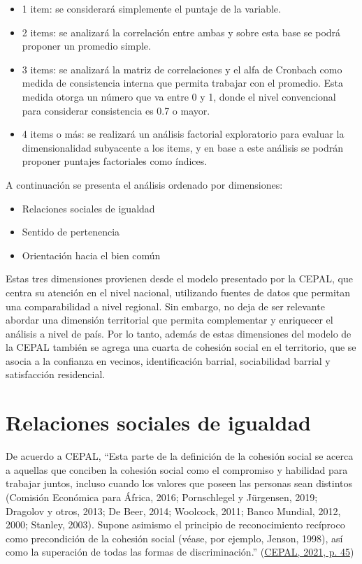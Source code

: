 \documentclass[
  12pt,
]{book}
\providecommand{\tightlist}{%
  \setlength{\itemsep}{0pt}\setlength{\parskip}{0pt}}
\begin{document}
\begin{itemize}
\item
  1 item: se considerará simplemente el puntaje de la variable.
\item
  2 items: se analizará la correlación entre ambas y sobre esta base se podrá proponer un promedio simple.
\item
  3 items: se analizará la matriz de correlaciones y el alfa de Cronbach como medida de consistencia interna que permita trabajar con el promedio. Esta medida otorga un número que va entre 0 y 1, donde el nivel convencional para considerar consistencia es 0.7 o mayor.
\item
  4 items o más: se realizará un análisis factorial exploratorio para evaluar la dimensionalidad subyacente a los items, y en base a este análisis se podrán proponer puntajes factoriales como índices.
\end{itemize}

A continuación se presenta el análisis ordenado por dimensiones:

\begin{itemize}
\tightlist
\item
  Relaciones sociales de igualdad
\item
  Sentido de pertenencia
\item
  Orientación hacia el bien común
\end{itemize}

Estas tres dimensiones provienen desde el modelo presentado por la CEPAL, que centra su atención en el nivel nacional, utilizando fuentes de datos que permitan una comparabilidad a nivel regional. Sin embargo, no deja de ser relevante abordar una dimensión territorial que permita complementar y enriquecer el análisis a nivel de país. Por lo tanto, además de estas dimensiones del modelo de la CEPAL también se agrega una cuarta de cohesión social en el territorio, que se asocia a la confianza en vecinos, identificación barrial, sociabilidad barrial y satisfacción residencial.

\hypertarget{relaciones-sociales-de-igualdad}{%
\section{Relaciones sociales de igualdad}\label{relaciones-sociales-de-igualdad}}

De acuerdo a CEPAL, ``Esta parte de la definición de la cohesión social se acerca a aquellas que conciben la cohesión social como el compromiso y habilidad para trabajar juntos, incluso cuando los valores que poseen las personas sean distintos (Comisión Económica para África, 2016; Pornschlegel y Jürgensen, 2019; Dragolov y otros, 2013; De Beer, 2014; Woolcock, 2011; Banco Mundial, 2012, 2000; Stanley, 2003). Supone asimismo el principio de reconocimiento recíproco como precondición de la cohesión social (véase, por ejemplo, Jenson, 1998), así como la superación de todas las formas de discriminación.'' (\protect\hyperlink{ref-cepal_Cohesion_2021}{CEPAL, 2021, p. 45})
\end{document}
